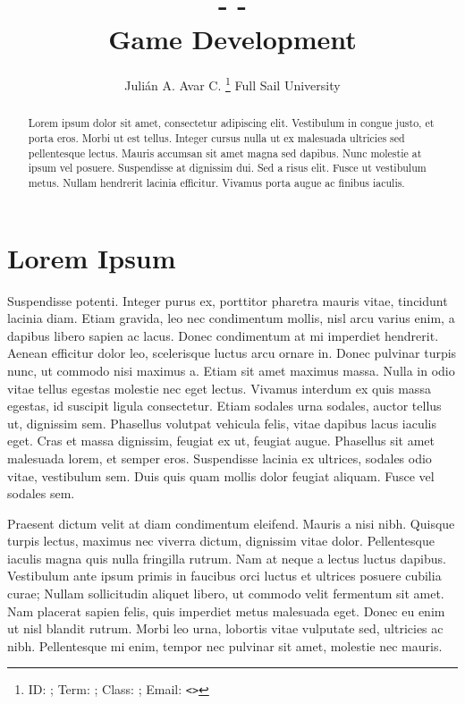 \documentclass[10pt, letterpaper]{article}
\title{
	 -  - \\
 	\large Game Development
}
\author{
	Julián A. Avar C. \thanks{
		ID: \texttt{};
		Term: \texttt{};
		Class: \texttt{};
		Email: \texttt{<>}
	} \authorcr
	Full Sail University
}
\theoremstyle{definition}
\begin{document}
	\maketitle
	
	\begin{abstract}
		Lorem \autocite{name} ipsum dolor sit amet, consectetur adipiscing elit. Vestibulum in congue justo, et porta eros. Morbi ut est tellus. Integer cursus nulla ut ex malesuada ultricies sed pellentesque lectus. Mauris accumsan sit amet magna sed dapibus. Nunc molestie at ipsum vel posuere. Suspendisse at dignissim dui. Sed a risus elit. Fusce ut vestibulum metus. Nullam hendrerit lacinia efficitur. Vivamus porta augue ac finibus iaculis.
	\end{abstract}

	
	\section{Lorem Ipsum}
	
	
	Suspendisse potenti. Integer purus ex, porttitor pharetra mauris vitae, tincidunt lacinia diam. Etiam gravida, leo nec condimentum mollis, nisl arcu varius enim, a dapibus libero sapien ac lacus. Donec condimentum at mi imperdiet hendrerit. Aenean efficitur dolor leo, scelerisque luctus arcu ornare in. Donec pulvinar turpis nunc, ut commodo nisi maximus a. Etiam sit amet maximus massa. Nulla in odio vitae tellus egestas molestie nec eget lectus. Vivamus interdum ex quis massa egestas, id suscipit ligula consectetur. Etiam sodales urna sodales, auctor tellus ut, dignissim sem. Phasellus volutpat vehicula felis, vitae dapibus lacus iaculis eget. Cras et massa dignissim, feugiat ex ut, feugiat augue. Phasellus sit amet malesuada lorem, et semper eros. Suspendisse lacinia ex ultrices, sodales odio vitae, vestibulum sem. Duis quis quam mollis dolor feugiat aliquam. Fusce vel sodales sem.
	
	Praesent dictum velit at diam condimentum eleifend. Mauris a nisi nibh. Quisque turpis lectus, maximus nec viverra dictum, dignissim vitae dolor. Pellentesque iaculis magna quis nulla fringilla rutrum. Nam at neque a lectus luctus dapibus. Vestibulum ante ipsum primis in faucibus orci luctus et ultrices posuere cubilia curae; Nullam sollicitudin aliquet libero, ut commodo velit fermentum sit amet. Nam placerat sapien felis, quis imperdiet metus malesuada eget. Donec eu enim ut nisl blandit rutrum. Morbi leo urna, lobortis vitae vulputate sed, ultricies ac nibh. Pellentesque mi enim, tempor nec pulvinar sit amet, molestie nec mauris. 
	
	\clearpage
	
	
	\printbibliography[title = {Bibliography}]
	
	\tableofcontents
	
\end{document}
